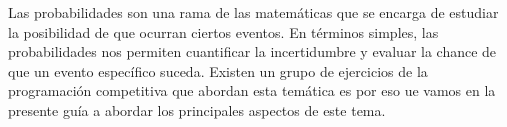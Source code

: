 Las probabilidades son una rama de las matemáticas que se encarga de estudiar la posibilidad de que ocurran ciertos eventos. En términos simples, las probabilidades nos permiten cuantificar la incertidumbre y evaluar la chance de que un evento específico suceda. Existen un grupo de ejercicios de la programación competitiva que abordan esta temática es por eso ue vamos en la presente guía a abordar los principales aspectos de este tema.

